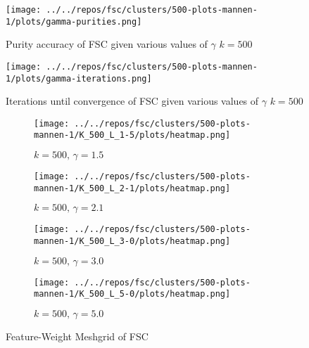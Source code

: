 \documentclass[../report.tex]{subfiles}
\begin{document}
\begin{frame}

\begin{figure}
\begin{minipage}{.45\textwidth}
  \texttt{[image: ../../repos/fsc/clusters/500-plots-mannen-1/plots/gamma-purities.png]}
  \caption{Purity accuracy of FSC given various values of $\gamma$ $k=500$}
  \label{fig:fsc-purity}
\end{minipage}\hfill
\begin{minipage}{.45\textwidth}
  \texttt{[image: ../../repos/fsc/clusters/500-plots-mannen-1/plots/gamma-iterations.png]}
  \caption{Iterations until convergence of FSC given various values of $\gamma$ $k=500$}
  \label{fig:fsc-iterations}
\end{minipage}
\end{figure}
\end{frame}


\begin{figure}[!h]
         \centering
     \begin{subfigure}{0.45\textwidth}
         \centering
         \texttt{[image: ../../repos/fsc/clusters/500-plots-mannen-1/K\_500\_L\_1-5/plots/heatmap.png]}
         \caption{$k=500 \text{, } \gamma=1.5$}
     \end{subfigure}
     \hfill
     \begin{subfigure}{0.45\textwidth}
         \centering
         \texttt{[image: ../../repos/fsc/clusters/500-plots-mannen-1/K\_500\_L\_2-1/plots/heatmap.png]}
         \caption{$k=500 \text{, } \gamma=2.1$}
     \end{subfigure}
     \hfill
     \centering
     \begin{subfigure}{0.45\textwidth}
         \centering
         \texttt{[image: ../../repos/fsc/clusters/500-plots-mannen-1/K\_500\_L\_3-0/plots/heatmap.png]}
         \caption{$k=500 \text{, } \gamma=3.0$}
     \end{subfigure}
     \hfill
     \centering
     \begin{subfigure}{0.45\textwidth}
         \centering
         \texttt{[image: ../../repos/fsc/clusters/500-plots-mannen-1/K\_500\_L\_5-0/plots/heatmap.png]}
         \caption{$k=500 \text{, } \gamma=5.0$}
     \end{subfigure}
      \caption{Feature-Weight Meshgrid of FSC}
      \label{fig:fsc-meshgrid}
\end{figure}
\end{document}
